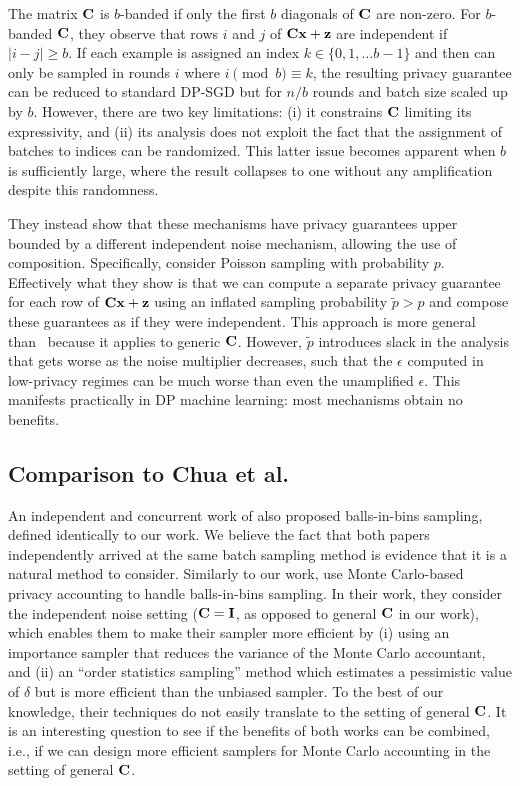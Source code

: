  The matrix $\mathbf{C}$ is $b$-banded if only the first $b$ diagonals of $\mathbf{C}$ are non-zero. For $b$-banded $\mathbf{C}$, they observe that rows $i$ and $j$ of $\mathbf{C}\mathbf{x} + \mathbf{z}$ are independent if $|i - j| \geq b$. If each example is assigned an index $k \in \{0, 1, \ldots b-1\}$ and then can only be sampled in rounds $i$ where $i \pmod b \equiv k$, the resulting privacy guarantee can be reduced to standard DP-SGD but for $n/b$ rounds and batch size scaled up by $b$. However, there are two key limitations: (i) it constrains $\mathbf{C}$ limiting its expressivity, and (ii) its analysis does not exploit the fact that the assignment of batches to indices can be randomized. This latter issue becomes apparent when $b$ is sufficiently large, where the result collapses to one without any amplification despite this randomness.

 They instead show that these mechanisms have privacy guarantees upper bounded by a different independent noise mechanism, allowing the use of composition.
Specifically, consider Poisson sampling with probability $p$. Effectively what they show is that we can compute a separate privacy guarantee for each row of $\mathbf{C} \mathbf{x} + \mathbf{z}$ using an inflated sampling probability $\tilde{p} > p$ and compose these guarantees as if they were independent. This approach is more general than~\citep{choquette2024amplified} because it applies to generic $\mathbf{C}$. However, $\tilde{p}$ introduces slack in the analysis that gets worse as the noise multiplier decreases, such that the $\epsilon$ computed in low-privacy regimes can be much worse than even the unamplified $\epsilon$. This manifests practically in DP machine learning: most mechanisms obtain no benefits.

\subsection{Comparison to Chua et al.}

An independent and concurrent work of \citet{chua2024ballsandbinssamplingdpsgd} also proposed balls-in-bins sampling, defined identically to our work. We believe the fact that both papers independently arrived at the same batch sampling method is evidence that it is a natural method to consider. Similarly to our work, \citet{chua2024ballsandbinssamplingdpsgd} use Monte Carlo-based privacy accounting to handle balls-in-bins sampling. In their work, they consider the independent noise setting ($\mathbf{C} = \mathbf{I}$, as opposed to general $\mathbf{C}$ in our work), which enables them to make their sampler more efficient by (i) using an importance sampler that reduces the variance of the Monte Carlo accountant, and (ii) an ``order statistics sampling'' method which estimates a pessimistic value of $\delta$ but is more efficient than the unbiased sampler. To the best of our knowledge, their techniques do not easily translate to the setting of general $\mathbf{C}$. It is an interesting question to see if the benefits of both works can be combined, i.e., if we can design more efficient samplers for Monte Carlo accounting in the setting of general $\mathbf{C}$.

